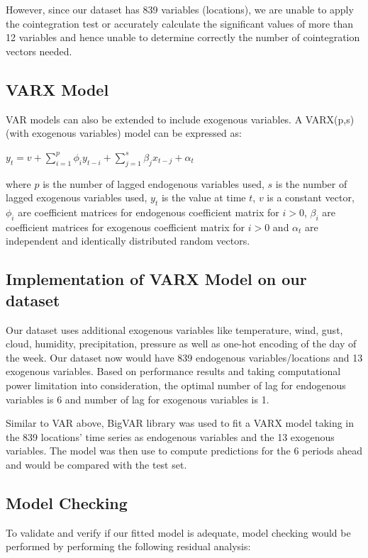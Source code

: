 \documentclass[12pt, letterpaper] {article}
\begin{document}
\noindent However, since our dataset has 839 variables (locations), we are unable to apply the cointegration test or accurately calculate the significant values of more than 12 variables and hence unable to determine correctly the number of cointegration vectors needed. 

\subsection{VARX Model}
VAR models can also be extended to include exogenous variables. A VARX(p,s) (with exogenous variables) model can be expressed as:

\begin{center}
    $\displaystyle y_t=v+\sum_{i=1}^{p} \phi_{i}y_{t-i}+\sum_{j=1}^{s} \beta_{j}x_{t-j}+\alpha_t$
\end{center}

\noindent where $p$ is the number of lagged endogenous variables used, $s$ is the number of lagged exogenous variables used, $y_t$ is the value at time $t$, $v$ is a constant vector, $\phi_i$ are coefficient matrices for endogenous coefficient matrix for $i>0$, $\beta_i$ are coefficient matrices for exogenous coefficient matrix for $i>0$ and $\alpha_t$ are independent and identically distributed random vectors. 

\subsection{Implementation of VARX Model on our dataset}
\noindent Our dataset uses additional exogenous variables like temperature, wind, gust, cloud, humidity, precipitation, pressure as well as one-hot encoding of the day of the week. Our dataset now would have 839 endogenous variables/locations and 13 exogenous variables. Based on performance results and taking computational power limitation into consideration, the optimal number of lag for endogenous variables is 6 and number of lag for exogenous variables is 1.

\noindent Similar to VAR above, BigVAR library was used to fit a VARX model taking in the 839 locations' time series as endogenous variables and the 13 exogenous variables. The model was then use to compute predictions for the 6 periods ahead and would be compared with the test set.

\subsection{Model Checking}
To validate and verify if our fitted model is adequate, model checking would be performed by performing the following residual analysis:
\end{document}
